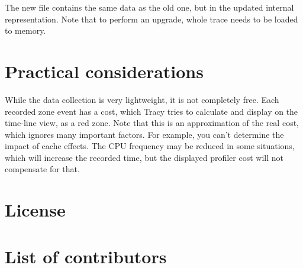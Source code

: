 \documentclass[hidelinks,titlepage,a4paper]{article}
\begin{document}
The new file contains the same data as the old one, but in the updated internal representation. Note that to perform an upgrade, whole trace needs to be loaded to memory.

\section{Practical considerations}

While the data collection is very lightweight, it is not completely free. Each recorded zone event has a cost, which Tracy tries to calculate and display on the time-line view, as a red zone. Note that this is an approximation of the real cost, which ignores many important factors. For example, you can't determine the impact of cache effects. The CPU frequency may be reduced in some situations, which will increase the recorded time, but the displayed profiler cost will not compensate for that.

\newpage
\appendix
\appendixpage

\section{License}



\section{List of contributors}


\end{document}
